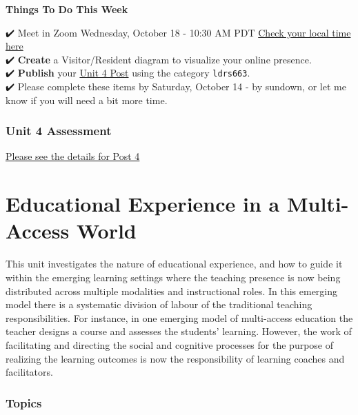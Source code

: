 \documentclass[
]{book}
\begin{document}
\begin{feedback}
\textbf{Things To Do This Week}

✔️ Meet in Zoom {Wednesday, October 18 - 10:30 AM PDT} \href{https://www.timeanddate.com/worldclock/fixedtime.html?msg=LDRS663+Meeting\&iso=20231018T1030\&p1=1109\&ah=1}{Check your local time here}\\
✔️ \textbf{Create} a Visitor/Resident diagram to visualize your online presence.\\
✔️ \textbf{Publish} your \href{https://ma-lead.github.io/ldrs663/assessments.html\#post-4}{Unit 4 Post} using the category \texttt{ldrs663}.\\
✔️ Please complete these items by {Saturday, October 14 - by sundown}, or let me know if you will need a bit more time.
\end{feedback}

\hypertarget{unit-4-assessment-1}{%
\subsection*{Unit 4 Assessment}\label{unit-4-assessment-1}}

\href{https://ma-lead.github.io/ldrs663/assessments.html\#post-4}{Please see the details for Post 4}

\hypertarget{educational-experience-in-a-multi-access-world}{%
\chapter{Educational Experience in a Multi-Access World}\label{educational-experience-in-a-multi-access-world}}

This unit investigates the nature of educational experience, and how to guide it within the emerging learning settings where the teaching presence is now being distributed across multiple modalities and instructional roles. In this emerging model there is a systematic division of labour of the traditional teaching responsibilities. For instance, in one emerging model of multi-access education the teacher designs a course and assesses the students' learning. However, the work of facilitating and directing the social and cognitive processes for the purpose of realizing the learning outcomes is now the responsibility of learning coaches and facilitators.

\hypertarget{topics-4}{%
\subsection*{Topics}\label{topics-4}}
\end{document}
